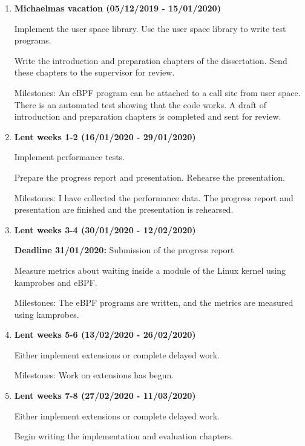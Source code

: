 \begin{enumerate}
        \item {\bf Michaelmas vacation (05/12/2019 - 15/01/2020)}
        
            Implement the user space library.
            Use the user space library to write test programs.
            
            Write the introduction and preparation chapters of the dissertation.
            Send these chapters to the supervisor for review.

            Milestones: An eBPF program can be attached to a call site from user space.
            There is an automated test showing that the code works.
            A draft of introduction and preparation chapters is completed and sent for review.

        \item {\bf Lent weeks 1-2 (16/01/2020 - 29/01/2020)} 

            Implement performance tests.

            Prepare the progress report and presentation. Rehearse the presentation.

            Milestones: I have collected the performance data.
            The progress report and presentation are finished and the presentation is rehearsed.

        \item {\bf Lent weeks 3-4 (30/01/2020 - 12/02/2020)} 

            {\bf Deadline 31/01/2020:} Submission of the progress report 
            
            Measure metrics about waiting inside a module of the Linux kernel using kamprobes and eBPF.

            Milestones: The eBPF programs are written, and the metrics are measured using kamprobes.

        \item {\bf Lent weeks 5-6 (13/02/2020 - 26/02/2020)} 

            Either implement extensions or complete delayed work.

            Milestones: Work on extensions has begun.

        \item {\bf Lent weeks 7-8 (27/02/2020 - 11/03/2020)}

            Either implement extensions or complete delayed work.
            
            Begin writing the implementation and evaluation chapters.


\end{enumerate}
